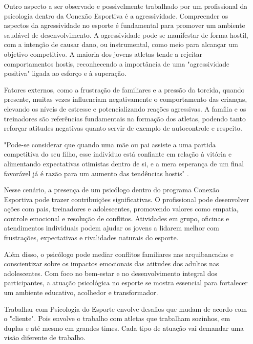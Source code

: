 \begin{Desenvolvimento}
Outro aspecto a ser observado e possivelmente trabalhado por um profissional da psicologia dentro da Conexão Esportiva é a agressividade. Compreender os aspectos da agressividade no esporte é fundamental para promover um ambiente saudável de desenvolvimento. A agressividade pode se manifestar de forma hostil, com a intenção de causar dano, ou instrumental, como meio para alcançar um objetivo competitivo. A maioria dos jovens atletas tende a rejeitar comportamentos hostis, reconhecendo a importância de uma "agressividade positiva" ligada ao esforço e à superação. 

Fatores externos, como a frustração de familiares e a pressão da torcida, quando presente, muitas vezes influenciam negativamente o comportamento das crianças, elevando os níveis de estresse e potencializando reações agressivas. A família e os treinadores são referências fundamentais na formação dos atletas, podendo tanto reforçar atitudes negativas quanto servir de exemplo de autocontrole e respeito. 

\begin{citacaodiretalonga}
"Pode-se considerar que quando uma mãe ou pai assiste a uma partida competitiva do seu filho, esse indivíduo está confiante em relação à vitória e alimentando expectativas otimistas dentro de si, e a mera esperança de um final favorável já é razão para um aumento das tendências hostis" .
\end{citacaodiretalonga}

Nesse cenário, a presença de um psicólogo dentro do programa Conexão Esportiva pode trazer contribuições significativas. O profissional pode desenvolver ações com pais, treinadores e adolescentes, promovendo valores como empatia, controle emocional e resolução de conflitos. Atividades em grupo, oficinas e atendimentos individuais podem ajudar os jovens a lidarem melhor com frustrações, expectativas e rivalidades naturais do esporte.

Além disso, o psicólogo pode mediar conflitos familiares nas arquibancadas e conscientizar sobre os impactos emocionais das atitudes dos adultos nas adolescentes. Com foco no bem-estar e no desenvolvimento integral dos participantes, a atuação psicológica no esporte se mostra essencial para fortalecer um ambiente educativo, acolhedor e transformador.

Trabalhar com Psicologia do Esporte envolve desafios que mudam de acordo com o "cliente".  Pois envolve o trabalho com atletas que trabalham sozinhos, em duplas e até mesmo em grandes times. Cada tipo de atuação vai demandar uma visão diferente de trabalho. 


\end{Desenvolvimento}
